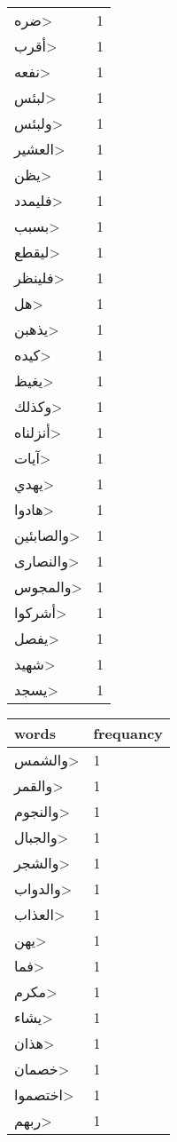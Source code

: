 \documentclass{article}
\begin{document}
\begin{multicols}{3}
\begin{center}
\begin{tabular}{ P{2cm}  P{1cm}}
\<ضره> & 1 \\ 
\<أقرب> & 1 \\ 
\<نفعه> & 1 \\ 
\<لبئس> & 1 \\ 
\<ولبئس> & 1 \\ 
\<العشير> & 1 \\ 
\<يظن> & 1 \\ 
\<فليمدد> & 1 \\ 
\<بسبب> & 1 \\ 
\<ليقطع> & 1 \\ 
\<فلينظر> & 1 \\ 
\<هل> & 1 \\ 
\<يذهبن> & 1 \\ 
\<كيده> & 1 \\ 
\<يغيظ> & 1 \\ 
\<وكذلك> & 1 \\ 
\<أنزلناه> & 1 \\ 
\<آيات> & 1 \\ 
\<يهدي> & 1 \\ 
\<هادوا> & 1 \\ 
\<والصابئين> & 1 \\ 
\<والنصارى> & 1 \\ 
\<والمجوس> & 1 \\ 
\<أشركوا> & 1 \\ 
\<يفصل> & 1 \\ 
\<شهيد> & 1 \\ 
\<يسجد> & 1 \\ 
\end{tabular} 
\begin{tabular}{ P{2cm}  P{1cm}} 
\textbf{words}    & \textbf{frequancy}  \\
\hline
\<والشمس> & 1 \\ 
\<والقمر> & 1 \\ 
\<والنجوم> & 1 \\ 
\<والجبال> & 1 \\ 
\<والشجر> & 1 \\ 
\<والدواب> & 1 \\ 
\<العذاب> & 1 \\ 
\<يهن> & 1 \\ 
\<فما> & 1 \\ 
\<مكرم> & 1 \\ 
\<يشاء> & 1 \\ 
\<هذان> & 1 \\ 
\<خصمان> & 1 \\ 
\<اختصموا> & 1 \\ 
\<ربهم> & 1 \\ 

\end{tabular}
\end{center}
\end{multicols}
\end{document}
